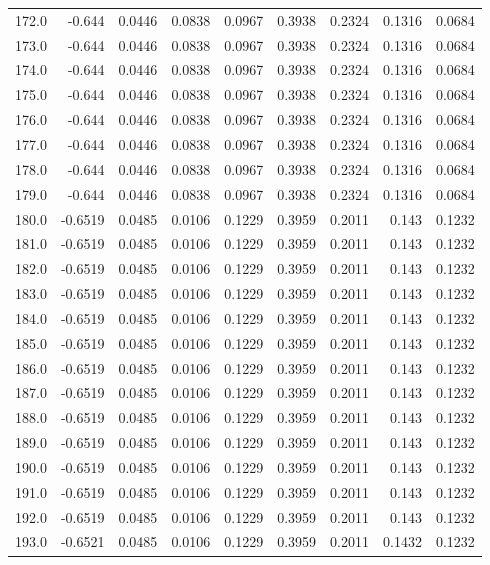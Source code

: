 \begin{longtable}{lrrrrrrrr}
172.0 & -0.644 & 0.0446 & 0.0838 & 0.0967 & 0.3938 & 0.2324 & 0.1316 & 0.0684 \\
173.0 & -0.644 & 0.0446 & 0.0838 & 0.0967 & 0.3938 & 0.2324 & 0.1316 & 0.0684 \\
174.0 & -0.644 & 0.0446 & 0.0838 & 0.0967 & 0.3938 & 0.2324 & 0.1316 & 0.0684 \\
175.0 & -0.644 & 0.0446 & 0.0838 & 0.0967 & 0.3938 & 0.2324 & 0.1316 & 0.0684 \\
176.0 & -0.644 & 0.0446 & 0.0838 & 0.0967 & 0.3938 & 0.2324 & 0.1316 & 0.0684 \\
177.0 & -0.644 & 0.0446 & 0.0838 & 0.0967 & 0.3938 & 0.2324 & 0.1316 & 0.0684 \\
178.0 & -0.644 & 0.0446 & 0.0838 & 0.0967 & 0.3938 & 0.2324 & 0.1316 & 0.0684 \\
179.0 & -0.644 & 0.0446 & 0.0838 & 0.0967 & 0.3938 & 0.2324 & 0.1316 & 0.0684 \\
180.0 & -0.6519 & 0.0485 & 0.0106 & 0.1229 & 0.3959 & 0.2011 & 0.143 & 0.1232 \\
181.0 & -0.6519 & 0.0485 & 0.0106 & 0.1229 & 0.3959 & 0.2011 & 0.143 & 0.1232 \\
182.0 & -0.6519 & 0.0485 & 0.0106 & 0.1229 & 0.3959 & 0.2011 & 0.143 & 0.1232 \\
183.0 & -0.6519 & 0.0485 & 0.0106 & 0.1229 & 0.3959 & 0.2011 & 0.143 & 0.1232 \\
184.0 & -0.6519 & 0.0485 & 0.0106 & 0.1229 & 0.3959 & 0.2011 & 0.143 & 0.1232 \\
185.0 & -0.6519 & 0.0485 & 0.0106 & 0.1229 & 0.3959 & 0.2011 & 0.143 & 0.1232 \\
186.0 & -0.6519 & 0.0485 & 0.0106 & 0.1229 & 0.3959 & 0.2011 & 0.143 & 0.1232 \\
187.0 & -0.6519 & 0.0485 & 0.0106 & 0.1229 & 0.3959 & 0.2011 & 0.143 & 0.1232 \\
188.0 & -0.6519 & 0.0485 & 0.0106 & 0.1229 & 0.3959 & 0.2011 & 0.143 & 0.1232 \\
189.0 & -0.6519 & 0.0485 & 0.0106 & 0.1229 & 0.3959 & 0.2011 & 0.143 & 0.1232 \\
190.0 & -0.6519 & 0.0485 & 0.0106 & 0.1229 & 0.3959 & 0.2011 & 0.143 & 0.1232 \\
191.0 & -0.6519 & 0.0485 & 0.0106 & 0.1229 & 0.3959 & 0.2011 & 0.143 & 0.1232 \\
192.0 & -0.6519 & 0.0485 & 0.0106 & 0.1229 & 0.3959 & 0.2011 & 0.143 & 0.1232 \\
193.0 & -0.6521 & 0.0485 & 0.0106 & 0.1229 & 0.3959 & 0.2011 & 0.1432 & 0.1232 \\

\end{longtable}
